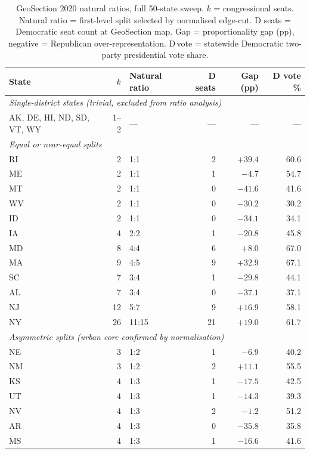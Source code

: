 \begin{table}[h]
\centering
\caption{GeoSection 2020 natural ratios, full 50-state sweep.
  $k$ = congressional seats.
  Natural ratio = first-level split selected by normalised edge-cut.
  D seats = Democratic seat count at GeoSection map.
  Gap = proportionality gap (pp), negative = Republican over-representation.
  D\,vote = statewide Democratic two-party presidential vote share.}
\label{tab:natural-ratios-2020}
\small
\begin{tabular}{l r l r r r}
\toprule
State & $k$ & Natural ratio & D seats & Gap (pp) & D vote \% \\
\midrule
\multicolumn{6}{l}{\textit{Single-district states (trivial, excluded from ratio analysis)}} \\
AK, DE, HI, ND, SD, VT, WY & 1--2 & --- & --- & --- & --- \\
\midrule
\multicolumn{6}{l}{\textit{Equal or near-equal splits}} \\
RI  &  2 & 1:1  &  2 & $+39.4$ & 60.6 \\
ME  &  2 & 1:1  &  1 & $-4.7$  & 54.7 \\
MT  &  2 & 1:1  &  0 & $-41.6$ & 41.6 \\
WV  &  2 & 1:1  &  0 & $-30.2$ & 30.2 \\
ID  &  2 & 1:1  &  0 & $-34.1$ & 34.1 \\
IA  &  4 & 2:2  &  1 & $-20.8$ & 45.8 \\
MD  &  8 & 4:4  &  6 & $+8.0$  & 67.0 \\
MA  &  9 & 4:5  &  9 & $+32.9$ & 67.1 \\
SC  &  7 & 3:4  &  1 & $-29.8$ & 44.1 \\
AL  &  7 & 3:4  &  0 & $-37.1$ & 37.1 \\
NJ  & 12 & 5:7  &  9 & $+16.9$ & 58.1 \\
NY  & 26 & 11:15 & 21 & $+19.0$ & 61.7 \\
\midrule
\multicolumn{6}{l}{\textit{Asymmetric splits (urban core confirmed by normalisation)}} \\
NE  &  3 & 1:2  &  1 & $-6.9$  & 40.2 \\
NM  &  3 & 1:2  &  2 & $+11.1$ & 55.5 \\
KS  &  4 & 1:3  &  1 & $-17.5$ & 42.5 \\
UT  &  4 & 1:3  &  1 & $-14.3$ & 39.3 \\
NV  &  4 & 1:3  &  2 & $-1.2$  & 51.2 \\
AR  &  4 & 1:3  &  0 & $-35.8$ & 35.8 \\
MS  &  4 & 1:3  &  1 & $-16.6$ & 41.6 \\

\end{tabular}
\end{table}
